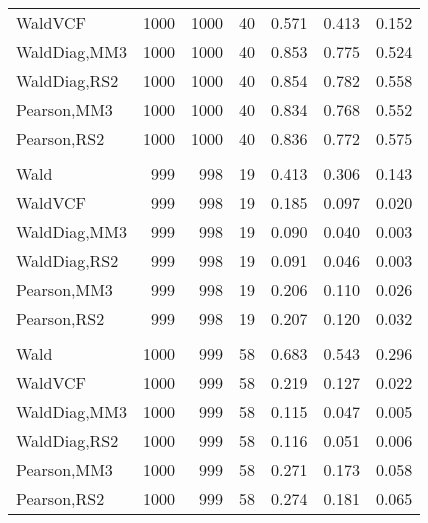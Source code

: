 \documentclass[
]{article}
\begin{document}
\begin{table}[H]
{\begin{tabular}[t]{lrrrrrr}
\hspace{1em}WaldVCF & 1000 & 1000 & 40 & 0.571 & 0.413 & 0.152\\
\hspace{1em}WaldDiag,MM3 & 1000 & 1000 & 40 & 0.853 & 0.775 & 0.524\\
\hspace{1em}WaldDiag,RS2 & 1000 & 1000 & 40 & 0.854 & 0.782 & 0.558\\
\hspace{1em}Pearson,MM3 & 1000 & 1000 & 40 & 0.834 & 0.768 & 0.552\\
\hspace{1em}Pearson,RS2 & 1000 & 1000 & 40 & 0.836 & 0.772 & 0.575\\
\addlinespace[0.3em]
\multicolumn{7}{l}{\textbf{2F 10V}}\\
\hspace{1em}Wald & 999 & 998 & 19 & 0.413 & 0.306 & 0.143\\
\hspace{1em}WaldVCF & 999 & 998 & 19 & 0.185 & 0.097 & 0.020\\
\hspace{1em}WaldDiag,MM3 & 999 & 998 & 19 & 0.090 & 0.040 & 0.003\\
\hspace{1em}WaldDiag,RS2 & 999 & 998 & 19 & 0.091 & 0.046 & 0.003\\
\hspace{1em}Pearson,MM3 & 999 & 998 & 19 & 0.206 & 0.110 & 0.026\\
\hspace{1em}Pearson,RS2 & 999 & 998 & 19 & 0.207 & 0.120 & 0.032\\
\addlinespace[0.3em]
\multicolumn{7}{l}{\textbf{3F 15V}}\\
\hspace{1em}Wald & 1000 & 999 & 58 & 0.683 & 0.543 & 0.296\\
\hspace{1em}WaldVCF & 1000 & 999 & 58 & 0.219 & 0.127 & 0.022\\
\hspace{1em}WaldDiag,MM3 & 1000 & 999 & 58 & 0.115 & 0.047 & 0.005\\
\hspace{1em}WaldDiag,RS2 & 1000 & 999 & 58 & 0.116 & 0.051 & 0.006\\
\hspace{1em}Pearson,MM3 & 1000 & 999 & 58 & 0.271 & 0.173 & 0.058\\
\hspace{1em}Pearson,RS2 & 1000 & 999 & 58 & 0.274 & 0.181 & 0.065\\
\bottomrule
\end{tabular}}
\endgroup{}
\end{table}
\end{document}
